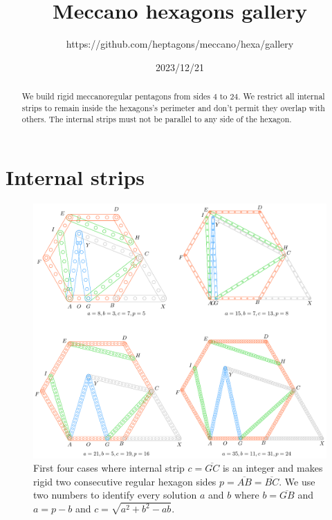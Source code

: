 \documentclass[11pt]{article}
\title{Meccano hexagons gallery}
\author{https://github.com/heptagons/meccano/hexa/gallery}
\date{2023/12/21}
\begin{document}
\maketitle
\begin{abstract}
We build rigid meccano\meccanoref regular pentagons from sides $4$ to $24$. We restrict all internal strips to remain inside the hexagons's perimeter and don't permit they overlap with others. The internal strips must not be parallel to any side of the hexagon.
\end{abstract}


\section{Internal strips}

\begin{figure}[h]
\centering
\includegraphics[scale=0.9]{build/hexa-builder-a}
\caption{First four cases where internal strip $c = \overline{GC}$ is an integer and makes rigid two consecutive regular hexagon sides $p = \overline{AB} = \overline{BC}$. We use two numbers to identify every solution $a$ and $b$ where $b = \overline{GB}$ and $a = p - b$ and $c = \sqrt{a^2+b^2-ab}$. }
\label{fig:builder-a}
\end{figure}
\end{document}
